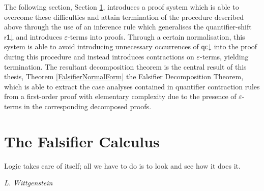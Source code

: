 \documentclass[10pt]{article}
\theoremstyle{definition}\newtheorem{remark}[theorem]{Remark}
\theoremstyle{definition}\newtheorem{example}[theorem]{Example}
\theoremstyle{definition}\newtheorem{definition}[theorem]{Definition}
\newcommand{\qcDown}{{\mathsf{qc\mathord\downarrow}}}
\newcommand{\rOneDown}{{\mathsf{r1\mathord\downarrow}}}
\begin{document}
	The following section, Section \ref{FalsifierCalculusSection}, introduces a proof system which is able to overcome these difficulties and attain termination of the procedure described above through the use of an inference rule which generalises the quantifier-shift $\rOneDown$ and introduces $\varepsilon$-terms into proofs. Through a certain normalisation, this system is able to avoid introducing unnecessary occurrences of $\qcDown$ into the proof during this procedure and instead introduces contractions on $\varepsilon$-terms, yielding termination. The resultant decomposition theorem is the central result of this thesis, Theorem \ref{FalsifierNormalForm} the Falsifier Decomposition Theorem, which is able to extract the case analyses contained in quantifier contraction rules from a first-order proof with elementary complexity due to the presence of $\varepsilon$-terms in the corresponding decomposed proofs.
	
	\pagebreak
	
	\section{The Falsifier Calculus}\label{FalsifierCalculusSection}
	
	\epigraph{Logic takes care of itself; all we have to do is to look and see how it does it.}{\textit{L. Wittgenstein}}
	
\end{document}
